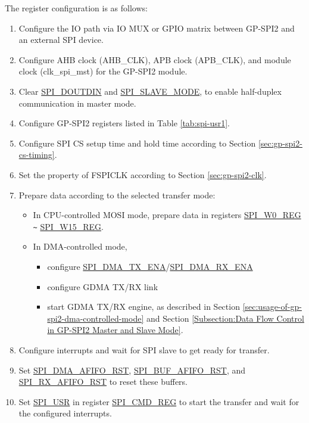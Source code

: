 \documentclass[main\_\_EN.tex]{subfiles}
\begin{document}
The register configuration is as follows:
\begin{enumerate}
    \item Configure the IO path via IO MUX or GPIO matrix between GP-SPI2 and an external SPI device.
    \item Configure AHB clock (AHB\_CLK), APB clock (APB\_CLK), and module clock (clk\_spi\_mst) for the GP-SPI2 module.

    \item Clear \hyperref[fielddesc:SPIDOUTDIN]{SPI\_DOUTDIN} and \hyperref[fielddesc:SPISLAVEMODE]{SPI\_SLAVE\_MODE}, to enable half-duplex communication in master mode.

    \item Configure GP-SPI2 registers listed in Table \ref{tab:spi-usr1}.

    \item Configure SPI CS setup time and hold time according to Section \ref{sec:gp-spi2-cs-timing}.

    \item Set the property of FSPICLK according to Section \ref{sec:gp-spi2-clk}.

    \item Prepare data according to the selected transfer mode:
    \begin{itemize}
        \item In CPU-controlled MOSI mode, prepare data in registers \hyperref[regdesc:SPIW0REG]{SPI\_W0\_REG} \verb+~+ \hyperref[regdesc:SPIW15REG]{SPI\_W15\_REG}.

        \item In DMA-controlled mode,
        \begin{itemize}
            \item configure \hyperref[fielddesc:SPIDMATXENA]{SPI\_DMA\_TX\_ENA}/\hyperref[fielddesc:SPIDMARXENA]{SPI\_DMA\_RX\_ENA}
            \item configure GDMA TX/RX link
            \item start GDMA TX/RX engine, as described in Section \ref{sec:usage-of-gp-spi2-dma-controlled-mode} and Section \ref{Subsection:Data Flow Control in GP-SPI2 Master and Slave Mode}.
        \end{itemize}
    \end{itemize}

    \item Configure interrupts and wait for SPI slave to get ready for transfer.

    \item Set \hyperref[fielddesc:SPIDMAAFIFORST]{SPI\_DMA\_AFIFO\_RST}, \hyperref[fielddesc:SPIBUFAFIFORST]{SPI\_BUF\_AFIFO\_RST}, and \hyperref[fielddesc:SPIRXAFIFORST]{SPI\_RX\_AFIFO\_RST} to reset these buffers.

    \item Set \hyperref[fielddesc:SPIUSR]{SPI\_USR} in register \hyperref[regdesc:SPICMDREG]{SPI\_CMD\_REG} to start the transfer and wait for the configured interrupts.
\end{enumerate}
\end{document}
